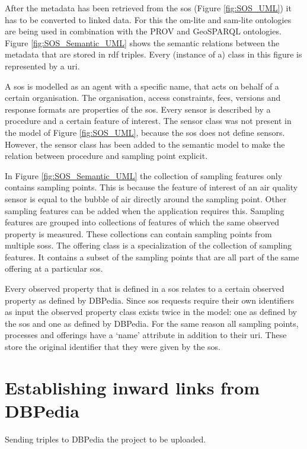 After the metadata has been retrieved from the \ac{sos} (Figure \ref{fig:SOS_UML}) it has to be converted to linked data. For this the om-lite and sam-lite ontologies are being used in combination with the PROV and GeoSPARQL ontologies. Figure \ref{fig:SOS_Semantic_UML} shows the semantic relations between the metadata that are stored in \ac{rdf} triples. Every (instance of a) class in this figure is represented by a \ac{uri}. 

A \ac{sos} is modelled as an agent with a specific name, that acts on behalf of a certain organisation. The organisation, access constraints, fees, versions and response formats are properties of the \ac{sos}. Every sensor is described by a procedure and a certain feature of interest. The sensor class was not present in the model of Figure \ref{fig:SOS_UML}, because the \ac{sos} does not define sensors. However, the sensor class has been added to the semantic model to make the relation between procedure and sampling point explicit. 

In Figure \ref{fig:SOS_Semantic_UML} the collection of sampling features only contains sampling points. This is because the feature of interest of an air quality sensor is equal to the bubble of air directly around the sampling point. Other sampling features can be added when the application requires this. Sampling features are grouped into collections of features of which the same observed property is measured. These collections can contain sampling points from multiple \aclp{sos}. The offering class is a specialization of the collection of sampling features. It contains a subset of the sampling points that are all part of the same offering at a particular \ac{sos}.

Every observed property that is defined in a \ac{sos} relates to a certain observed property as defined by DBPedia. Since \ac{sos} requests require their own identifiers as input the observed property class exists twice in the model: one as defined by the \ac{sos} and one as defined by DBPedia. For the same reason all sampling points, processes and offerings have a `name' attribute in addition to their \ac{uri}. These store the original identifier that they were given by the \ac{sos}.

\section{Establishing inward links from DBPedia}
Sending triples to DBPedia the project to be uploaded.


